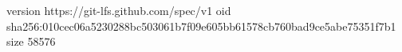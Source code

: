 version https://git-lfs.github.com/spec/v1
oid sha256:010cec06a5230288bc503061b7f09e605bb61578cb760bad9ce5abe75351f7b1
size 58576

